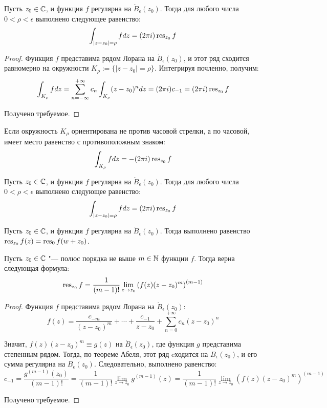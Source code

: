 \begin{proposition}
	Пусть $z_0 \in \mathbb{C}$, и функция $f$ регулярна на $\mathring B_\epsilon(z_0)$. Тогда для любого числа $0 < \rho < \epsilon$ выполнено следующее равенство:
	\[\int_{|z - z_0| = \rho}fdz = (2\pi i)\operatorname{res}_{z_0}f\]
\end{proposition}

\begin{proof}
	Функция $f$ представима рядом Лорана на $\mathring B_\epsilon(z_0)$, и этот ряд сходится равномерно на окружности $K_\rho:= \{|z - z_0| = \rho\}$. Интегрируя почленно, получим:
	\[\int_{K_\rho}fdz = \sum\limits_{n = -\infty}^{+\infty}c_n\int_{K_\rho}(z-z_0)^ndz = (2\pi i)c_{-1} = (2\pi i)\operatorname{res}_{z_0}f\]
	
	Получено требуемое.
\end{proof}

\begin{note}
	Если окружность $K_\rho$ ориентирована не против часовой стрелки, а по часовой, имеет место равенство с противоположным знаком:
	\[\int_{K_\rho}fdz = -(2\pi i)\operatorname{res}_{z_0}f\]
\end{note}

\begin{proposition}
	Пусть $z_0 \in \mathbb{C}$, и функция $f$ регулярна на $\mathring B_\epsilon(z_0)$. Тогда для любого числа $0 < \rho < \epsilon$ выполнено следующее равенство:
	\[\int_{|z - z_0| = \rho}fdz = (2\pi i)\operatorname{res}_{z_0}f\]
\end{proposition}

\begin{note}
	Пусть $z_0 \in \mathbb{C}$, и функция $f$ регулярна на $\mathring B_\epsilon(z_0)$. Тогда выполнено равенство $\operatorname{res}_{z_0}f(z) = \operatorname{res}_0f(w + z_0)$.
\end{note}

\begin{proposition}
	Пусть $z_0 \in \mathbb{C}$ "--- полюс порядка не выше $m \in \mathbb{N}$ функции $f$. Тогда верна следующая формула:
	\[\operatorname{res}_{z_0}f = \frac{1}{(m-1)!}\lim_{z \to z_0}\left(f(z)(z - z_0)^m\right)^{(m-1)}\]
\end{proposition}

\begin{proof}
	Функция $f$ представима рядом Лорана на $\mathring B_\epsilon(z_0)$:
	\[f(z) = \frac{c_{-m}}{(z-z_0)^m} + \dotsb + \frac{c_{-1}}{z-z_0} + \sum_{n = 0}^{+\infty}c_n(z - z_0)^n\]
	
	Значит, $f(z)(z-z_0)^m \equiv g(z)$ на $\mathring B_\epsilon(z_0)$, где функция $g$ представима степенным рядом. Тогда, по теореме Абеля, этот ряд cходится на $B_\epsilon(z_0)$, и его сумма регулярна на $B_\epsilon(z_0)$. Следовательно, выполнено равенство:
	\[c_{-1} = \frac{g^{(m-1)}(z_0)}{(m-1)!} = \frac1{{(m-1)!}}\lim_{z \to z_0}g^{(m-1)}(z) = \frac{1}{(m-1)!}\lim_{z \to z_0}\left(f(z)(z - z_0)^m\right)^{(m-1)}\]
	
	Получено требуемое.
\end{proof}

